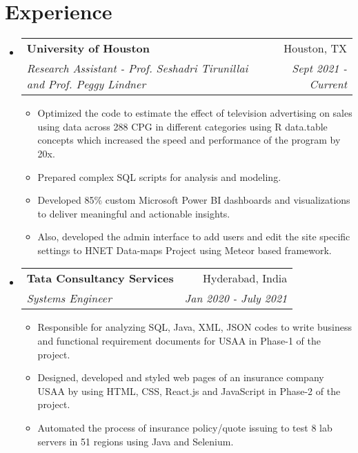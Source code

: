 \documentclass[letterpaper,10.8pt]{article}
\makeatletter
\newcommand{\resumeSubheading}[4]{
  \vspace{-1pt}\item
    \begin{tabular*}{0.97\textwidth}{l@{\extracolsep{\fill}}r}
      \textbf{#1} & #2 \\
      \textit{\small#3} & \textit{\small #4} \\
    \end{tabular*}\vspace{-5pt}
}
\newcommand{\resumeSubHeadingListStart}{\begin{itemize}[leftmargin=*]}
\newcommand{\resumeSubHeadingListEnd}{\end{itemize}}
\newcommand{\resumeItemListStart}{\begin{itemize}}
\newcommand{\resumeItemListEnd}{\end{itemize}\vspace{-5pt}}
\makeatother
\begin{document}
\section{Experience}
  \resumeSubHeadingListStart
    \resumeSubheading
    {University of Houston}{Houston, TX}
    {Research Assistant - Prof. Seshadri Tirunillai and Prof. Peggy Lindner}{Sept 2021 -  Current}
    \resumeItemListStart
        \item{Optimized the code to estimate the effect of television advertising on sales using data across 288 CPG in different categories using R data.table concepts which increased the speed and performance of the program by 20x.}
          \item{Prepared complex SQL scripts for analysis and modeling.}
          \item{Developed 85\% custom Microsoft Power BI dashboards and visualizations to deliver meaningful and actionable insights.}
          \item{Also, developed the admin interface to add users and edit the site specific settings to HNET Data-maps Project using Meteor based framework.}
      \resumeItemListEnd
    \resumeSubheading
    {Tata Consultancy Services}{Hyderabad, India}
    {Systems Engineer}{Jan 2020 - July 2021}
    \resumeItemListStart
    \item{Responsible for analyzing SQL, Java, XML, JSON codes to write business and functional requirement documents for USAA in Phase-1 of the project.}
    \item {Designed, developed and styled web pages of an insurance company USAA by using HTML, CSS, React.js and JavaScript in Phase-2 of the project.}
    \item {Automated the process of insurance policy/quote issuing to test 8 lab servers in 51 regions using Java and Selenium.}
    \resumeItemListEnd
\resumeSubHeadingListEnd

\end{document}
